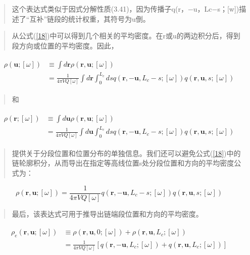 \begin{quotation}
	这个表达式类似于因式分解性质(3.41)，因为传播子q(r，−u，Lc−s；[w])描述了“互补”链段的统计权重，其符号为u倒。
\end{quotation}
\begin{quotation}
	从公式(\ref{18})中可以得到几个相关的平均密度。在r或u的两边积分后，得到段方向或位置的平均密度。因此，
\end{quotation}
\begin{align}\label{19}
\begin{split}
\rho(\mathbf{u};[\omega])&\equiv\int d\mathbf{r} \rho(\mathbf{r},\mathbf{u};[\omega]) \\&=\frac{1}{4\pi VQ[\omega]}\int d\mathbf{r} \int_{0}^{L_c}dsq(\mathbf{r},-\mathbf{u},L_c-s;[\omega])q(\mathbf{r},\mathbf{u},s;[\omega])
\end{split}
\end{align}
\begin{quotation}
	和
\end{quotation}
\begin{align}\label{20}
\begin{split}
\rho(\mathbf{r};[\omega])&\equiv\int d\mathbf{u} \rho(\mathbf{r},\mathbf{u};[\omega]) \\&=\frac{1}{4\pi VQ[\omega]}\int d\mathbf{u} \int_{0}^{L_c}dsq(\mathbf{r},-\mathbf{u},L_c-s;[\omega])q(\mathbf{r},\mathbf{u},s;[\omega])
\end{split}
\end{align}
\begin{quotation}
	提供关于分段位置和位置分布的单独信息。我们还可以避免公式(\ref{18})中的链轮廓积分，从而导出在指定等高线位置s处分段位置和方向的平均密度公式为：
\end{quotation}
\begin{equation}\label{21}
\rho(\mathbf{r},\mathbf{u};[\omega])=\frac{1}{4\pi VQ[\omega]}q(\mathbf{r},-\mathbf{u},L_c-s;[\omega])q(\mathbf{r},\mathbf{u},s;[\omega])
\end{equation}
\begin{quotation}
	最后，该表达式可用于推导出链端段位置和方向的平均密度。
\end{quotation}
\begin{align}\label{22}
\begin{split}
\rho_e(\mathbf{r},\mathbf{u};[\omega])&\equiv\rho(\mathbf{r},\mathbf{u},0;[\omega])+\rho(\mathbf{r},\mathbf{u},L_c;[\omega])\\ &=\frac{1}{4\pi VQ[\omega]}[q(\mathbf{r},-\mathbf{u},L_c;[\omega])+q(\mathbf{r},\mathbf{u},L_c;[\omega])]
\end{split}
\end{align}
